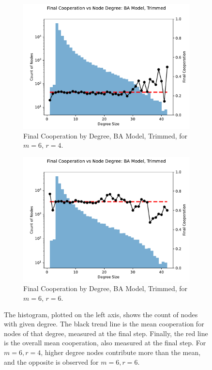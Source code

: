 \FloatBarrier 
\begin{figure}[!h]
  \begin{subfigure}[b]{0.45\textwidth}
    \includegraphics[width=1.1\textwidth]{images/Rep_BA_node_groups_m_6_phi_4_trimmed.pdf}
    \caption{Final Cooperation by Degree, BA Model, Trimmed, for $m=6$, $r=4$.   }
    \label{by_degree_m_6_phi_4}
  \end{subfigure}
  \hfill
  \begin{subfigure}[b]{0.45\textwidth}
    \includegraphics[width=1.1\textwidth]{images/Rep_BA_node_groups_m_6_phi_6_trimmed.pdf}
    \caption{Final Cooperation by Degree, BA Model, Trimmed, for $m=6$, $r=6$. }
    \label{by_degree_m_6_phi_6}
  \end{subfigure}
  \caption{The histogram, plotted on the left axis, shows the count of nodes with given degree. The black trend line is the mean cooperation for nodes of that degree, measured at the final step. Finally, the red line is the overall mean cooperation, also measured at the final step. For $m=6, r=4$, higher degree nodes contribute more than the mean, and the opposite is observed for $m=6,r=6$.  } \label{by_degree_m_6}
\end{figure} 
\FloatBarrier

